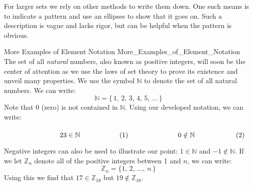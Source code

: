         For larger sets we rely on other methods to write them down. One
        such means is to indicate a pattern and use an ellipses to show that
        it goes on. Such a description is vague and lacks rigor, but can be
        helpful when the pattern is obvious.
        \begin{lexample}{More Examples of Element Notation}
                        {More_Examples_of_Element_Notation}
            The set of all \textit{natural} numbers, also known as
            positive integers, will soon be the center of attention as we
            use the laws of set theory to prove its existence and unveil
            many properties. We use the symbol $\mathbb{N}$ to denote the
            set of all natural numbers. We can write:
            \begin{equation}
                \mathbb{N}=\{\,1,\,2,\,3,\,4,\,5,\,\dots\,\}
            \end{equation}
            Note that 0 (zero) is not contained in $\mathbb{N}$. Using our
            developed notation, we can write:
            \par
            \begin{subequations}
                \begin{minipage}[b]{0.49\textwidth}
                    \begin{equation}
                        23\in\mathbb{N}
                    \end{equation}
                \end{minipage}
                \hfill
                \begin{minipage}[b]{0.49\textwidth}
                    \begin{equation}
                        0\notin\mathbb{N}
                    \end{equation}
                \end{minipage}
            \end{subequations}
            \par\vspace{2.5ex}
            Negative integers can also be used to illustrate our point:
            $1\in\mathbb{N}$ and $\minus{1}\notin\mathbb{N}$. If we let
            $\mathbb{Z}_{n}$ denote all of the positive integers between
            1 and $n$, we can write:
            \begin{equation}
                \mathbb{Z}_{n}=\{1,\,2,\,\dots,\,n\,\}
            \end{equation}
            Using this we find that $17\in\mathbb{Z}_{18}$ but
            $19\notin\mathbb{Z}_{18}$.
        \end{lexample}
